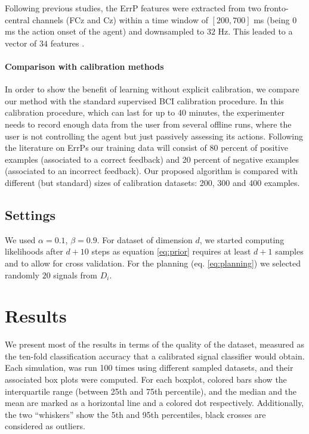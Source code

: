 Following previous studies, the ErrP features were extracted from two fronto-central channels (FCz and Cz) within a time window of $[200,700]$ ms (being 0 ms the action onset of the agent) and downsampled to $32$ Hz. This leaded to a vector of $34$ features \cite{iturrate2013task}.

\paragraph{Comparison with calibration methods}
In order to show the benefit of learning without explicit calibration, we compare our method with the standard supervised BCI calibration procedure. In this calibration procedure, which can last for up to 40 minutes, the experimenter needs to record enough data from the user from several offline runs, where the user is not controlling the agent but just passively assessing its actions.
%
Following the literature on ErrPs \cite{chavarriaga2010learning,iturrate2013task} our training data will consist of 80 percent of positive examples (associated to a correct feedback) and 20 percent of negative examples (associated to an incorrect feedback). Our proposed algorithm is compared with different (but standard) sizes of calibration datasets: 200, 300 and 400 examples.

\subsection{Settings}

We used $\alpha = 0.1$, $\beta = 0.9$. For dataset of dimension $d$, we started computing likelihoods after $d+10$ steps as equation \ref{eq:prior} requires at least $d+1$ samples and to allow for cross validation. For the planning (eq. \ref{eq:planning}) we selected randomly $20$ signals from $D_i$.

\section{Results}
\label{chapter:planning:results}


We present most of the results in terms of the quality of the dataset, measured as the ten-fold classification accuracy that a calibrated signal classifier would obtain. Each simulation, was run 100 times using different sampled datasets, and their associated box plots \cite{mcgill1978variations} were computed. For each boxplot, colored bars show the interquartile range (between 25th and 75th percentile), and the median and the mean are marked as a horizontal line and a colored dot respectively. Additionally, the two ``whiskers'' show the 5th and 95th percentiles, black crosses are considered as outliers. 


